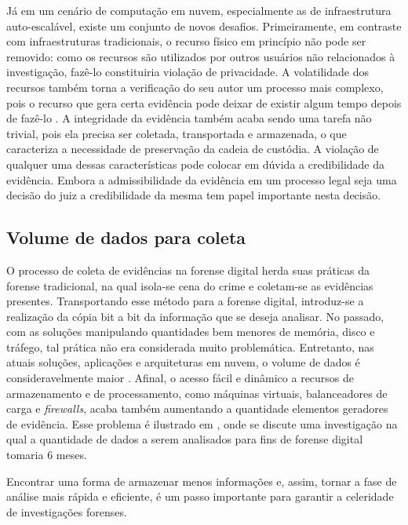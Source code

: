 Já em um cenário de computação em nuvem, especialmente as de infraestrutura auto-escalável, existe um conjunto de novos desafios. 
%
Primeiramente, em contraste com infraestruturas tradicionais, o recurso físico em princípio não pode ser removido: como os recursos são utilizados por outros usuários não relacionados à investigação, fazê-lo constituiria violação de privacidade.
%
A volatilidade dos recursos também torna a verificação do seu autor um processo mais complexo, pois o recurso que gera certa evidência pode deixar de existir algum tempo depois de fazê-lo \cite{SimouCloudChlng:2014}.
%
A integridade da evidência também acaba sendo uma tarefa não trivial, pois ela precisa ser coletada, transportada e armazenada, o que caracteriza a necessidade de preservação da cadeia de custódia.
%
A violação de qualquer uma dessas características pode colocar em dúvida a credibilidade da evidência. Embora a admissibilidade da evidência em um processo legal seja uma decisão do juiz a credibilidade da mesma tem papel importante nesta decisão.


\subsection{Volume de dados para coleta}
\label{sec:volumedados}

O processo de coleta de evidências na forense digital herda suas práticas da forense tradicional, na qual isola-se cena do crime e coletam-se as evidências presentes. 
%
Transportando esse método para a forense digital, introduz-se a realização da cópia bit a bit da informação que se deseja analisar.
%
No passado, com as soluções manipulando quantidades bem menores de memória, disco e tráfego, tal prática não era considerada muito problemática. 
%
Entretanto, nas atuais soluções, aplicações e arquiteturas em nuvem, o volume de dados é consideravelmente maior \cite{QuickIncreaseVolumeImpact:2014}.
%
Afinal, o acesso fácil e dinâmico a recursos de armazenamento e de processamento, como máquinas virtuais, balanceadores de carga e \textit{firewalls}, acaba também aumentando a quantidade elementos geradores de evidência.
%
Esse problema é ilustrado em \cite{QuickIncreaseVolumeImpact:2014}, onde se discute uma investigação na qual a quantidade de dados a serem analisados para fins de forense digital tomaria 6 meses.


Encontrar uma forma de armazenar menos informações e, assim, tornar a fase de análise mais rápida e eficiente, é um passo importante para garantir a celeridade de investigações forenses.


